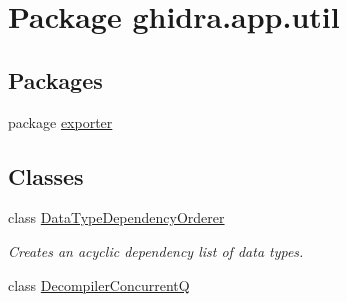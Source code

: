\hypertarget{namespaceghidra_1_1app_1_1util}{}\section{Package ghidra.\+app.\+util}
\label{namespaceghidra_1_1app_1_1util}
\subsection*{Packages}
\begin{DoxyCompactItemize}
\item 
package \mbox{\hyperlink{namespaceghidra_1_1app_1_1util_1_1exporter}{exporter}}
\end{DoxyCompactItemize}
\subsection*{Classes}
\begin{DoxyCompactItemize}
\item 
class \mbox{\hyperlink{classghidra_1_1app_1_1util_1_1_data_type_dependency_orderer}{Data\+Type\+Dependency\+Orderer}}
\begin{DoxyCompactList}\small\item\em Creates an acyclic dependency list of data types. \end{DoxyCompactList}\item 
class \mbox{\hyperlink{classghidra_1_1app_1_1util_1_1_decompiler_concurrent_q}{Decompiler\+ConcurrentQ}}
\end{DoxyCompactItemize}
